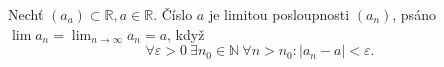 \begin{definition}
	Nechť $(a_a) \subset \mathbb{R}, a \in \mathbb{R}$.
	Číslo $a$ je limitou posloupnosti $(a_n)$, psáno $\lim a_n = \lim_{n \rightarrow \infty} a_n = a$, když
	$$\forall \varepsilon > 0 \  \exists n_0 \in \mathbb{N} \  \forall n > n_0 \colon |a_n - a| < \varepsilon.$$
	\label{def:limita_vlastni}
\end{definition}

